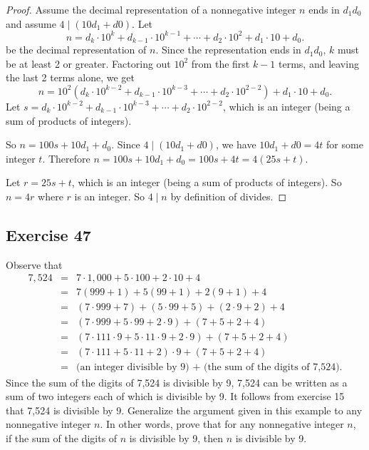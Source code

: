 \documentclass[14pt]{extarticle}
\begin{document}
\begin{proof}
    Assume the decimal representation of a nonnegative integer $n$ ends in $d_1d_0$ and assume $4 \mid (10d_1 + d0)$. Let
    \[
        n = d_k \cdot 10^k + d_{k-1} \cdot 10^{k-1} + \cdots + d_2 \cdot 10^2 + d_1 \cdot 10 + d_0.
    \]
    be the decimal representation of $n$. Since the representation ends in $d_1d_0$, $k$ must be at least 2 or greater. Factoring out $10^2$ from the first $k-1$ terms, and leaving the last 2 terms alone, we get
    \[
        n = 10^2(d_k \cdot 10^{k-2} + d_{k-1} \cdot 10^{k-3} + \cdots + d_2 \cdot 10^{2-2}) + d_1 \cdot 10 + d_0.
    \]
    Let $s = d_k \cdot 10^{k-2} + d_{k-1} \cdot 10^{k-3} + \cdots + d_2 \cdot 10^{2-2}$, which is an integer (being a sum of products of integers).

    So $n = 100s + 10d_1 + d_0$. Since $4 \mid (10d_1 + d0)$, we have $10d_1 + d0 = 4t$ for some integer $t$. Therefore $n = 100s + 10d_1 + d_0 = 100s + 4t = 4(25s+t)$.

    Let $r = 25s+t$, which is an integer (being a sum of products of integers). So $n = 4r$ where $r$ is an integer. So $4 \mid n$ by definition of divides.
\end{proof}

\subsection{Exercise 47}
Observe that
\[
    \begin{array}{rcl}
        7,524 & = & 7 \cdot 1,000 + 5 \cdot 100 + 2 \cdot 10 + 4                             \\
              & = & 7(999 + 1) + 5(99 + 1) + 2(9 + 1) + 4                                    \\
              & = & (7 \cdot 999 + 7) + (5 \cdot 99 + 5) + (2 \cdot 9 + 2) + 4               \\
              & = & (7 \cdot 999 + 5 \cdot 99 + 2 \cdot 9) + (7 + 5 + 2 + 4)                 \\
              & = & (7 \cdot 111 \cdot 9 + 5 \cdot 11 \cdot 9 + 2 \cdot 9) + (7 + 5 + 2 + 4) \\
              & = & (7 \cdot 111 + 5 \cdot 11 + 2) \cdot 9 + (7 + 5 + 2 + 4)                 \\
              & = & \text{(an integer divisible by 9) + (the sum of the digits of 7,524)}.
    \end{array}
\]
Since the sum of the digits of 7,524 is divisible by 9, 7,524 can be written as a sum of two integers each of which is divisible by 9. It follows from exercise 15 that 7,524 is divisible by 9. Generalize the argument given in this example to any nonnegative integer $n$. In other words, prove that for any nonnegative integer $n$, if the sum of the digits of $n$ is divisible by 9, then $n$ is divisible by 9.
\end{document}
